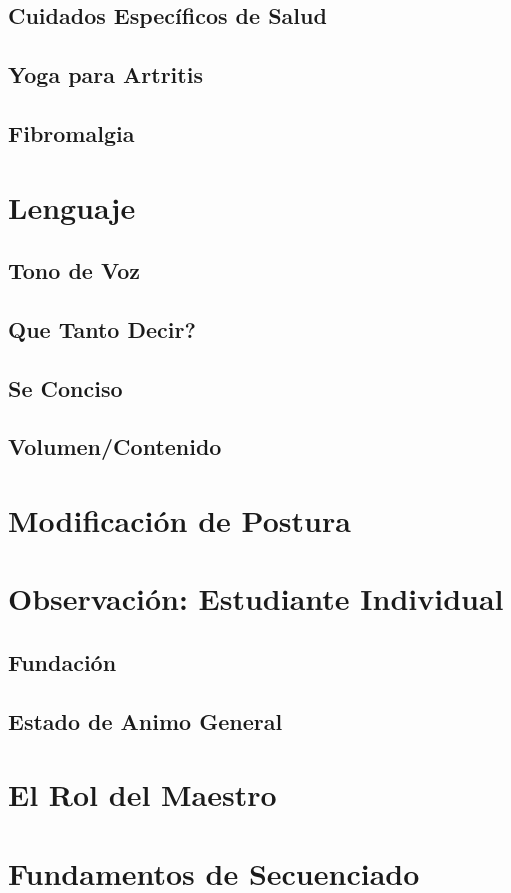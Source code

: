 \subsection{Cuidados Específicos de Salud}
\subsection{Yoga para Artritis}
\subsection{Fibromalgia}
\section{Lenguaje}
\subsection{Tono de Voz}
\subsection{Que Tanto Decir?}
\subsection{Se Conciso}
\subsection{Volumen/Contenido}
\section{Modificación de Postura}
\section{Observación: Estudiante Individual}
\subsection{Fundación}
\subsection{Estado de Animo General}
\section{El Rol del Maestro}
\section{Fundamentos de Secuenciado}
